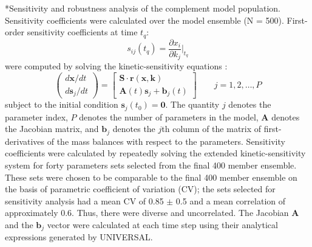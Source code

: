 \documentclass[12pt]{article}
\makeatletter
\renewcommand\subsection{\@startsection
	{subsection}{2}{0mm}
	{-0.05in}
	{-0.5\baselineskip}
	{\normalfont\normalsize\bfseries}}
\makeatother
\begin{document}
\subsection*{Sensitivity and robustness analysis of the complement model population.}
Sensitivity coefficients were calculated over the model ensemble (N = 500). 
First-order sensitivity coefficients at time $t_{q}$:  
\begin{equation}\label{eqn_sen}
s_{ij}\left(t_{q}\right)=\frac{\partial{x_{i}}}{\partial{k_{j}}}\Biggr|_{t_{q}}
\end{equation}
were computed by solving the kinetic-sensitivity equations \cite{dickinson1976sensitivity}:
\begin{equation}\label{eqn_extended}
\begin{pmatrix}
d{\mathbf{x}}/dt\\
d{\mathbf{s}}_{j}/dt
\end{pmatrix}=
\begin{bmatrix}
\mathbf{S}\cdot\mathbf{r}\left(\mathbf{x},\mathbf{k}\right) \\
\mathbf{A}\left(t\right)\mathbf{s}_{j}+\mathbf{b}_{j}\left(t\right)
\end{bmatrix}\qquad j=1,2,\hdots,P
\end{equation}
subject to the initial condition $\textbf{s}_{j}(t_{0}) = \textbf{0}$.
The quantity $j$ denotes the parameter index, $P$ denotes the number of parameters in the model, $\mathbf{A}$ denotes the Jacobian matrix, and $\mathbf{b}_j$ denotes the $j$th column of the matrix of first-derivatives of the mass balances with respect to the parameters.
Sensitivity coefficients were calculated by repeatedly solving the extended kinetic-sensitivity system for forty parameters sets selected from the final 400 member ensemble. 
These sets were chosen to be comparable to the final 400 member ensemble on the basis of parametric coefficient of variation (CV); the sets selected for sensitivity analysis had a 
mean CV of 0.85 $\pm$ 0.5 and a mean correlation of approximately 0.6. Thus, there were diverse and uncorrelated.
The Jacobian $\mathbf{A}$ and the $\mathbf{b}_{j}$ vector were calculated at each time step using their analytical expressions generated by UNIVERSAL.
\end{document}

